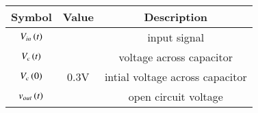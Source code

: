 \begin{tabular}{|c|c|c|}
    \hline
            \textbf{Symbol} & \textbf{Value} & \textbf{Description} \\
    \hline
          $V_{in}\left(t\right)$ &  & input signal\\
    \hline
          $V_c\left(t\right)$ &  & voltage across capacitor\\
    \hline 
          $V_c\left(0\right)$ &$0.3$V &intial voltage across capacitor\\
    \hline
          $v_{out}\left(t\right)$ & &open circuit voltage\\
    \hline    
  \end{tabular}
